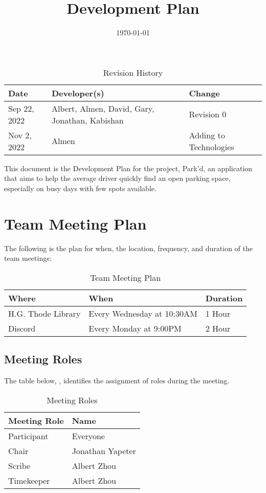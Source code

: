 \documentclass[12pt,letterpaper]{article}
\title{Development Plan\\\progname}
\author{\authname}
\date{\today}
\begin{document}
\maketitle

\newpage
\begin{table}[hp]
\caption{Revision History} \label{TblRevisionHistory}
\begin{tabularx}{\textwidth}{p{3cm}p{2.5cm}X}
\toprule
\textbf{Date} & \textbf{Developer(s)} & \textbf{Change}\\
\midrule
Sep 22, 2022 & Albert, Almen, David, Gary, Jonathan, Kabishan & Revision 0\\
\midrule
Nov 2, 2022 & Almen & Adding to Technologies\\
\bottomrule
\end{tabularx}
\end{table}

\newpage
\tableofcontents
\newpage
\listoftables
\newpage

This document is the Development Plan for the project, Park'd, an application
that aims to help the average driver quickly find an open parking space,
especially on busy days with few spots available.
\section{Team Meeting Plan}
\label{TeamMeetingPlan}
The following is the plan for when, the location, frequency, and duration of the
team meetings:
\begin{table}[hp]
\begin{tabularx}{\textwidth}{|l|l|X|}
\toprule
\textbf{Where} & \textbf{When} & \textbf{Duration}\\
\midrule
H.G. Thode Library & Every Wednesday at 10:30AM & 1 Hour\\
Discord & Every Monday at 9:00PM & 2 Hour\\
\bottomrule
\end{tabularx}
\caption{Team Meeting Plan} \label{tab:teamMeetingPlan}
\end{table}

\subsection{Meeting Roles}
\label{meetingRoles}
The table below, , identifies the assignment of roles
during the meeting.
\begin{table}[hp] 
    \centering
    \begin{tabularx}{\textwidth}{|X|X|}
        \toprule
        \textbf{Meeting Role} & \textbf{Name}\\
        \midrule
        Participant & Everyone\\
        Chair & Jonathan Yapeter\\
        Scribe & Albert Zhou\\
        Timekeeper & Albert Zhou\\
        \bottomrule
    \end{tabularx}
\caption{Meeting Roles} 
\label{meetingRolesTable}
\end{table}
\end{document}
